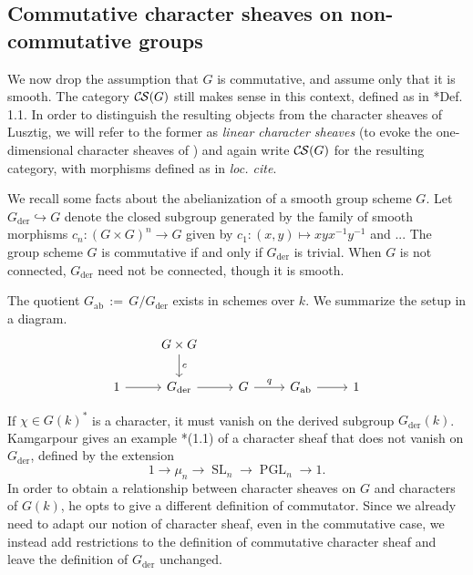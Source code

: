 \documentclass[10pt]{amsart}
\theoremstyle{plain}
\theoremstyle{definition}
\newcommand{\Fq}{k}
\DeclareMathOperator{\SL}{SL}
\DeclareMathOperator{\PGL}{PGL}
\newcommand{\der}{_{\operatorname{der}}}
\newcommand{\ab}{_{\operatorname{ab}}}
\newcommand{\ceq}{{\, :=\, }}
\newcommand{\CS}{{\mathcal{C\hskip-0.8pt S}}}
\begin{document}
\subsection{Commutative character sheaves on non-commutative groups}

We now drop the assumption that $G$ is commutative, and assume only that it is smooth.
The category $\CS(G)$ still makes sense in this context, defined as in \cite{cunningham-roe:13a}*{Def. 1.1}.
In order to distinguish the resulting objects from
the character sheaves of Lusztig, we will refer to the former as \emph{linear character sheaves}
(to evoke the one-dimensional character sheaves of \cite{Kamgarpour})
and again write $\CS(G)$ for the resulting category, with morphisms defined as in \emph{loc. cite}.

We recall some facts about the abelianization of a smooth group scheme $G$.
Let $G\der \hookrightarrow G$ denote the closed subgroup generated by the family of smooth morphisms
$c_n: (G\times G)^n \to G$ given by $c_1: (x,y)\mapsto xyx^{-1}y^{-1}$ and ...
The group scheme $G$ is commutative if and only if $G\der$ is trivial.
When $G$ is not connected, $G\der$ need not be connected, though it is smooth.

The quotient $G\ab\ceq G/G\der$ exists in schemes over $\Fq$.
We summarize the setup in a diagram.
\[
\begin{tikzcd}
{} & G\times G \arrow{d}{c} &&&\\
1 \arrow{r} & G\der \arrow{r}{} & G \arrow{r}{q} & G\ab \arrow{r} & 1
\end{tikzcd}
\]

If $\chi \in G(k)^*$ is a character, it must vanish on the derived subgroup $G\der(k)$.
Kamgarpour gives an example \cite{kamgarpour:09a}*{(1.1)} of a character sheaf
that does not vanish on $G\der$, defined by the extension
\[
1 \to \mu_n \to \SL_n \to \PGL_n \to 1.
\]
In order to obtain a relationship between character sheaves on $G$ and characters of $G(k)$,
he opts to give a different definition of commutator.  Since we already need to adapt our
notion of character sheaf, even in the commutative case, we instead add restrictions
to the definition of commutative character sheaf and leave the definition of $G\der$ unchanged.
\end{document}
